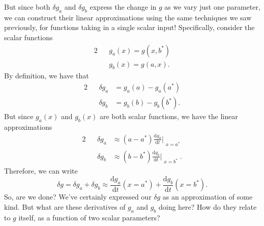 \documentclass[letterpaper]{article}
\theoremstyle{remark}
\newcommand{\dt}{\mathrm{d}t}
\newcommand{\diff}{\mathrm{d}}
\newcommand{\eqn}[1]{\begin{alignat*}{2}#1\end{alignat*}}
\begin{document}
But since both $\delta g_a$ and $\delta g_b$ express the change in $g$ as we vary just one parameter, we can construct their linear approximations using the same techniques we saw previously, for functions taking in a single scalar input! Specifically, consider the scalar functions
\eqn{
    && g_a(x) = g(x, b^*) \\
    && g_b(x) = g(a, x).
}
By definition, we have that
\eqn{
    && \delta g_a &= g_a(a) - g_a(a^*) \\
    && \delta g_b &= g_b(b) - g_b(b^*).
}
But since $g_a(x)$ and $g_b(x)$ are both scalar functions, we have the linear approximations
\eqn{
    && \delta g_a &\approx (a - a^*) \frac{\diff g_a}{\dt}\Bigr|_{\substack{x=a^*}} \\
    && \delta g_b &\approx (b - b^*) \frac{\diff g_b}{\dt}\Bigr|_{\substack{x=b^*}}.
}
Therefore, we can write
\[
    \delta g = \delta g_a + \delta g_b \approx \frac{\diff g_a}{\dt}(x=a^*) + \frac{\diff g_b}{\dt}(x=b^*).
\]
So, are we done? We've certainly expressed our $\delta g$ as an approximation of some kind. But what are these derivatives of $g_a$ and $g_b$ doing here? How do they relate to $g$ itself, as a function of two scalar parameters?
\end{document}
